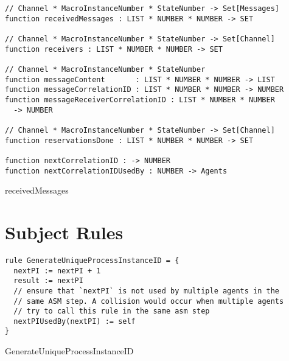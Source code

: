 \begin{listing}[H]
\begin{verbatim}
// Channel * MacroInstanceNumber * StateNumber -> Set[Messages]
function receivedMessages : LIST * NUMBER * NUMBER -> SET

// Channel * MacroInstanceNumber * StateNumber -> Set[Channel]
function receivers : LIST * NUMBER * NUMBER -> SET

// Channel * MacroInstanceNumber * StateNumber
function messageContent       : LIST * NUMBER * NUMBER -> LIST
function messageCorrelationID : LIST * NUMBER * NUMBER -> NUMBER
function messageReceiverCorrelationID : LIST * NUMBER * NUMBER
  -> NUMBER

// Channel * MacroInstanceNumber * StateNumber -> Set[Channel]
function reservationsDone : LIST * NUMBER * NUMBER -> SET

function nextCorrelationID : -> NUMBER
function nextCorrelationIDUsedBy : NUMBER -> Agents
\end{verbatim}
\caption{receivedMessages}
\label{lst:asm:receivedMessages}
\end{listing}




\section{Subject Rules}


\begin{listing}[H]
\begin{verbatim}
rule GenerateUniqueProcessInstanceID = {
  nextPI := nextPI + 1
  result := nextPI
  // ensure that `nextPI` is not used by multiple agents in the
  // same ASM step. A collision would occur when multiple agents
  // try to call this rule in the same asm step
  nextPIUsedBy(nextPI) := self
}
\end{verbatim}
\caption{GenerateUniqueProcessInstanceID}
\label{lst:asm:GenerateUniqueProcessInstanceID}
\end{listing}



